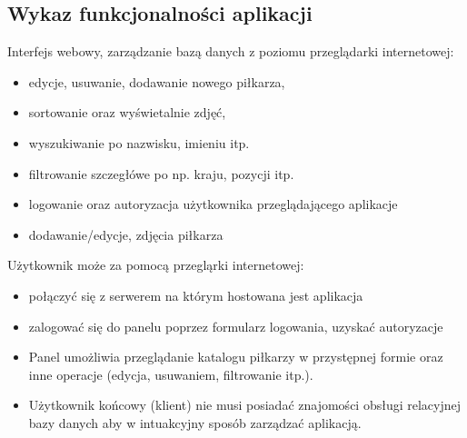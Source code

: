 \subsection{Wykaz funkcjonalności aplikacji}
    \begin{flushleft}
        Interfejs webowy, zarządzanie bazą danych z poziomu przeglądarki internetowej:

        \begin{itemize}
            \item edycje, usuwanie, dodawanie nowego piłkarza,
            \item sortowanie oraz wyświetalnie zdjęć,
            \item wyszukiwanie po nazwisku, imieniu itp.
            \item filtrowanie szczegłówe po np. kraju, pozycji itp.
            \item logowanie oraz autoryzacja użytkownika przeglądającego aplikacje
            \item dodawanie/edycje, zdjęcia piłkarza\newline\newline
        \end{itemize}


         Użytkownik może za pomocą przegląrki internetowej:
        \begin{itemize}
            \item  połączyć się z serwerem na którym hostowana jest aplikacja
            \item zalogować się do panelu poprzez formularz logowania, uzyskać autoryzacje
            \item Panel umożliwia przeglądanie katalogu  piłkarzy w przystępnej formie oraz inne operacje (edycja, usuwaniem, filtrowanie itp.).
            \item Użytkownik końcowy (klient) nie musi posiadać znajomości obsługi relacyjnej bazy danych aby w intuakcyjny sposób zarządzać aplikacją.
        \end{itemize}


    \end{flushleft}
    \pagebreak

